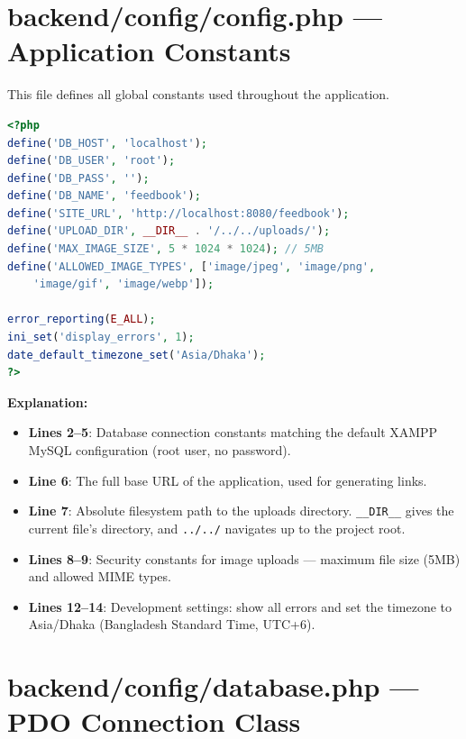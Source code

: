 \documentclass[12pt,a4paper]{report}
\begin{document}
\section{backend/config/config.php --- Application Constants}
This file defines all global constants used throughout the application.

\begin{lstlisting}[language=PHP]
<?php
define('DB_HOST', 'localhost');
define('DB_USER', 'root');
define('DB_PASS', '');
define('DB_NAME', 'feedbook');
define('SITE_URL', 'http://localhost:8080/feedbook');
define('UPLOAD_DIR', __DIR__ . '/../../uploads/');
define('MAX_IMAGE_SIZE', 5 * 1024 * 1024); // 5MB
define('ALLOWED_IMAGE_TYPES', ['image/jpeg', 'image/png',
    'image/gif', 'image/webp']);

error_reporting(E_ALL);
ini_set('display_errors', 1);
date_default_timezone_set('Asia/Dhaka');
?>
\end{lstlisting}

\textbf{Explanation:}
\begin{itemize}
    \item \textbf{Lines 2--5}: Database connection constants matching the default XAMPP MySQL configuration (root user, no password).
    \item \textbf{Line 6}: The full base URL of the application, used for generating links.
    \item \textbf{Line 7}: Absolute filesystem path to the uploads directory. \texttt{\_\_DIR\_\_} gives the current file's directory, and \texttt{../../} navigates up to the project root.
    \item \textbf{Lines 8--9}: Security constants for image uploads --- maximum file size (5MB) and allowed MIME types.
    \item \textbf{Lines 12--14}: Development settings: show all errors and set the timezone to Asia/Dhaka (Bangladesh Standard Time, UTC+6).
\end{itemize}

\section{backend/config/database.php --- PDO Connection Class}
\end{document}
